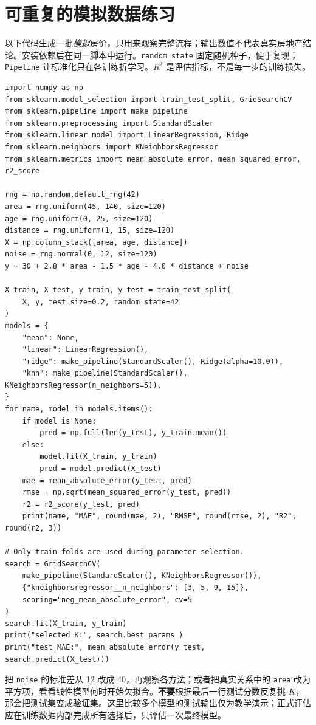 \documentclass[UTF8,11pt,oneside]{ctexbook}
\begin{document}
\section{可重复的模拟数据练习}
以下代码生成一批\emph{模拟}房价，只用来观察完整流程；输出数值不代表真实房地产结论。安装依赖后在同一脚本中运行。\texttt{random\_state} 固定随机种子，便于复现；\texttt{Pipeline} 让标准化只在各训练折学习。$R^2$ 是评估指标，不是每一步的训练损失。
\begin{lstlisting}
import numpy as np
from sklearn.model_selection import train_test_split, GridSearchCV
from sklearn.pipeline import make_pipeline
from sklearn.preprocessing import StandardScaler
from sklearn.linear_model import LinearRegression, Ridge
from sklearn.neighbors import KNeighborsRegressor
from sklearn.metrics import mean_absolute_error, mean_squared_error, r2_score

rng = np.random.default_rng(42)
area = rng.uniform(45, 140, size=120)
age = rng.uniform(0, 25, size=120)
distance = rng.uniform(1, 15, size=120)
X = np.column_stack([area, age, distance])
noise = rng.normal(0, 12, size=120)
y = 30 + 2.8 * area - 1.5 * age - 4.0 * distance + noise

X_train, X_test, y_train, y_test = train_test_split(
    X, y, test_size=0.2, random_state=42
)
models = {
    "mean": None,
    "linear": LinearRegression(),
    "ridge": make_pipeline(StandardScaler(), Ridge(alpha=10.0)),
    "knn": make_pipeline(StandardScaler(), KNeighborsRegressor(n_neighbors=5)),
}
for name, model in models.items():
    if model is None:
        pred = np.full(len(y_test), y_train.mean())
    else:
        model.fit(X_train, y_train)
        pred = model.predict(X_test)
    mae = mean_absolute_error(y_test, pred)
    rmse = np.sqrt(mean_squared_error(y_test, pred))
    r2 = r2_score(y_test, pred)
    print(name, "MAE", round(mae, 2), "RMSE", round(rmse, 2), "R2", round(r2, 3))

# Only train folds are used during parameter selection.
search = GridSearchCV(
    make_pipeline(StandardScaler(), KNeighborsRegressor()),
    {"kneighborsregressor__n_neighbors": [3, 5, 9, 15]},
    scoring="neg_mean_absolute_error", cv=5
)
search.fit(X_train, y_train)
print("selected K:", search.best_params_)
print("test MAE:", mean_absolute_error(y_test, search.predict(X_test)))
\end{lstlisting}
把 \texttt{noise} 的标准差从 12 改成 40，再观察各方法；或者把真实关系中的 \texttt{area} 改为平方项，看看线性模型何时开始欠拟合。\textbf{不要}根据最后一行测试分数反复挑 $K$，那会把测试集变成验证集。这里比较多个模型的测试输出仅为教学演示；正式评估应在训练数据内部完成所有选择后，只评估一次最终模型。
\end{document}
